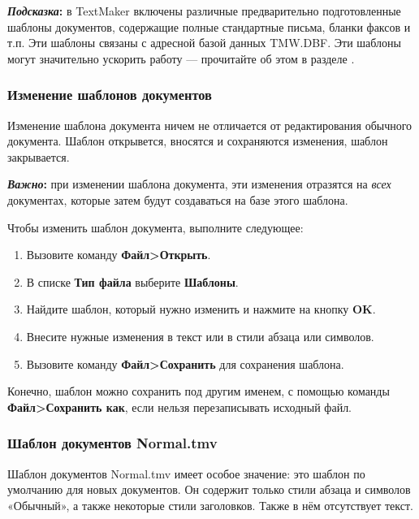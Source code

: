 ﻿\documentclass[a4paper,10pt]{article}
\begin{document}
\begin{mdframed}[backgroundcolor=blue!10]
\textbf{\textit{Подсказка}:} в TextMaker включены различные предварительно подготовленные шаблоны документов, содержащие полные стандартные письма, бланки факсов и т.п. Эти шаблоны связаны с адресной базой данных TMW.DBF. Эти шаблоны могут значительно ускорить работу — прочитайте об этом в разделе .
\end{mdframed}

\subsubsection{Изменение шаблонов документов}
Изменение шаблона документа ничем не отличается от редактирования обычного документа. Шаблон открывется, вносятся и сохраняются изменения, шаблон закрывается. 

\begin{mdframed}[backgroundcolor=blue!10]
\textbf{\textit{Важно}:} при изменении шаблона документа, эти изменения отразятся на \textit{всех} документах, которые затем будут создаваться на базе этого шаблона.
\end{mdframed}

Чтобы изменить шаблон документа, выполните следующее:
\begin{enumerate}
 \item Вызовите команду \textbf{Файл>Открыть}.
 \item В списке \textbf{Тип файла} выберите \textbf{Шаблоны}.
 \item Найдите шаблон, который нужно изменить и нажмите на кнопку \textbf{OK}.
 \item Внесите нужные изменения в текст или в стили абзаца или символов.
 \item Вызовите команду \textbf{Файл>Сохранить} для сохранения шаблона.
\end{enumerate}

Конечно, шаблон можно сохранить под другим именем, с помощью команды \textbf{Файл>Сохранить как}, если нельзя перезаписывать исходный файл.

\subsubsection{Шаблон документов Normal.tmv}
Шаблон документов Normal.tmv имеет особое значение: это шаблон по умолчанию для новых документов. Он содержит только стили абзаца и символов «Обычный», а также некоторые стили заголовков. Также в нём отсутствует текст.
\end{document}
